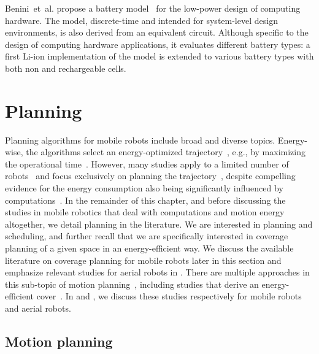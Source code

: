 Benini~et~al. propose a battery model~\citep{benini2001discrete} for the low-power design of computing hardware. The model, discrete-time and intended for system-level design environments, is also derived from an equivalent circuit. Although specific to the design of computing hardware applications, it evaluates different battery types: a first Li-ion implementation of the model is extended to various battery types with both non and rechargeable cells.


\section{Planning}
\label{sec:soa-motion-pl}

Planning algorithms for mobile robots include broad and diverse topics. Energy-wise, the algorithms select an energy-optimized trajectory~\citep{mei2004energy}, e.g., by maximizing the operational time~\citep{wahab2015energy}. However, many studies apply to a limited number of robots~\citep{kim2005energy} and focus exclusively on planning the trajectory~\citep{kim2008minimum}, despite compelling evidence for the energy consumption also being significantly influenced by computations~\citep{ondruska2015scheduled,mei2005case}. 
In the remainder of this chapter, and before discussing the studies in mobile robotics that deal with computations and motion energy altogether, we detail planning in the literature. 
We are interested in planning and scheduling, and further recall that we are specifically interested in coverage planning of a given space in an energy-efficient way. We discuss the available literature on coverage planning for mobile robots later in this section and emphasize relevant studies for aerial robots in . There are multiple approaches in this sub-topic of motion planning~\citep{choset2001coverage,cabreira2019survey}, including studies that derive an energy-efficient cover~\citep{wei2018coverage,cabreira2018energy}. In  and , we discuss these studies respectively for mobile robots and aerial robots. 

\subsection{Motion planning}


